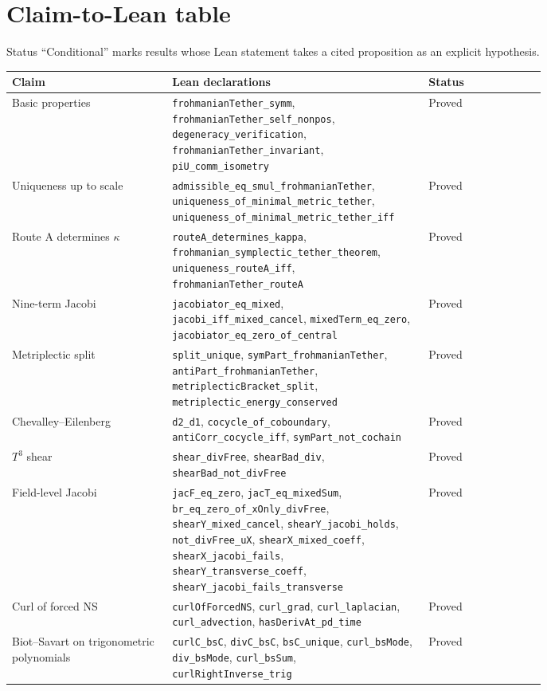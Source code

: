\documentclass[11pt]{article}
\theoremstyle{definition}
\theoremstyle{remark}
\begin{document}
\section*{Claim-to-Lean table}
Status ``Conditional'' marks results whose Lean statement takes a cited proposition as an explicit hypothesis.
{\small\begin{longtable}{p{0.3\linewidth}p{0.48\linewidth}l}\hline Claim & Lean declarations & Status\\\hline
Basic properties & \texttt{frohmanianTether\_symm}, \texttt{frohmanianTether\_self\_nonpos}, \texttt{degeneracy\_verification}, \texttt{frohmanianTether\_invariant}, \texttt{piU\_comm\_isometry} & Proved\\
Uniqueness up to scale & \texttt{admissible\_eq\_smul\_frohmanianTether}, \texttt{uniqueness\_of\_minimal\_metric\_tether}, \texttt{uniqueness\_of\_minimal\_metric\_tether\_iff} & Proved\\
Route A determines $\kappa$ & \texttt{routeA\_determines\_kappa}, \texttt{frohmanian\_symplectic\_tether\_theorem}, \texttt{uniqueness\_routeA\_iff}, \texttt{frohmanianTether\_routeA} & Proved\\
Nine-term Jacobi & \texttt{jacobiator\_eq\_mixed}, \texttt{jacobi\_iff\_mixed\_cancel}, \texttt{mixedTerm\_eq\_zero}, \texttt{jacobiator\_eq\_zero\_of\_central} & Proved\\
Metriplectic split & \texttt{split\_unique}, \texttt{symPart\_frohmanianTether}, \texttt{antiPart\_frohmanianTether}, \texttt{metriplecticBracket\_split}, \texttt{metriplectic\_energy\_conserved} & Proved\\
Chevalley--Eilenberg & \texttt{d2\_d1}, \texttt{cocycle\_of\_coboundary}, \texttt{antiCorr\_cocycle\_iff}, \texttt{symPart\_not\_cochain} & Proved\\
$T^3$ shear & \texttt{shear\_divFree}, \texttt{shearBad\_div}, \texttt{shearBad\_not\_divFree} & Proved\\
Field-level Jacobi & \texttt{jacF\_eq\_zero}, \texttt{jacT\_eq\_mixedSum}, \texttt{br\_eq\_zero\_of\_xOnly\_divFree}, \texttt{shearY\_mixed\_cancel}, \texttt{shearY\_jacobi\_holds}, \texttt{not\_divFree\_uX}, \texttt{shearX\_mixed\_coeff}, \texttt{shearX\_jacobi\_fails}, \texttt{shearY\_transverse\_coeff}, \texttt{shearY\_jacobi\_fails\_transverse} & Proved\\
Curl of forced NS & \texttt{curlOfForcedNS}, \texttt{curl\_grad}, \texttt{curl\_laplacian}, \texttt{curl\_advection}, \texttt{hasDerivAt\_pd\_time} & Proved\\
Biot--Savart on trigonometric polynomials & \texttt{curlC\_bsC}, \texttt{divC\_bsC}, \texttt{bsC\_unique}, \texttt{curl\_bsMode}, \texttt{div\_bsMode}, \texttt{curl\_bsSum}, \texttt{curlRightInverse\_trig} & Proved\\

\end{longtable}}
\end{document}
